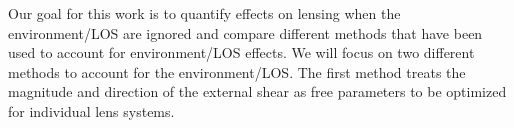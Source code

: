 Our goal for this work is to quantify effects on lensing when the environment/LOS are ignored and compare different methods that have been used to account for environment/LOS effects. We will focus on two different methods to account for the environment/LOS. The first method treats the magnitude and direction of the external shear as free parameters to be optimized for individual lens systems.